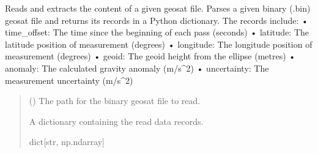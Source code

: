 \documentclass[letterpaper,10pt,english]{sphinxmanual}
\begin{document}
\begin{fulllineitems}
\label{\detokenize{modules/gravity/geosat:qnav.gravity.geosat.read_geosat_file}}
\pysigstartsignatures
{}
\pysigstopsignatures
\sphinxAtStartPar
Reads and extracts the content of a given geosat file.
Parses a given binary (.bin) geosat file and returns its records in a
Python dictionary. The records include:
• time\_offset:  The time since the beginning of each pass (seconds)
• latitude:     The latitude position of measurement (degrees)
• longitude:    The longitude position of measurement (degrees)
• geoid:        The geoid height from the ellipse (metres)
• anomaly:      The calculated gravity anomaly (m/s\textasciicircum{}2)
• uncertainty:  The measurement uncertainty (m/s\textasciicircum{}2)
\begin{quote}\begin{description}
\sphinxAtStartPar
{} () \textendash{} The path for the binary geosat file to read.

\sphinxAtStartPar
A dictionary containing the read data records.

\sphinxAtStartPar
dict{[}str, np.ndarray{]}

\end{description}\end{quote}

\end{fulllineitems}

\end{document}
